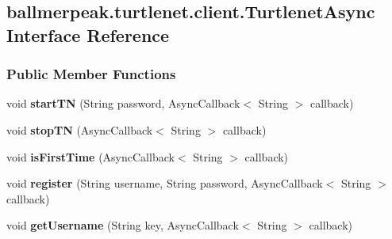 \hypertarget{interfaceballmerpeak_1_1turtlenet_1_1client_1_1TurtlenetAsync}{\subsection{ballmerpeak.\-turtlenet.\-client.\-Turtlenet\-Async Interface Reference}
\label{interfaceballmerpeak_1_1turtlenet_1_1client_1_1TurtlenetAsync}
}
\subsubsection*{Public Member Functions}
\begin{DoxyCompactItemize}
\item 
\hypertarget{interfaceballmerpeak_1_1turtlenet_1_1client_1_1TurtlenetAsync_a7e875c3b32ebacefaffa6ebd69aa2f44}{void {\bfseries start\-T\-N} (String password, Async\-Callback$<$ String $>$ callback)}\label{interfaceballmerpeak_1_1turtlenet_1_1client_1_1TurtlenetAsync_a7e875c3b32ebacefaffa6ebd69aa2f44}

\item 
\hypertarget{interfaceballmerpeak_1_1turtlenet_1_1client_1_1TurtlenetAsync_a70baaa36490a38c7e74cd9f57358336e}{void {\bfseries stop\-T\-N} (Async\-Callback$<$ String $>$ callback)}\label{interfaceballmerpeak_1_1turtlenet_1_1client_1_1TurtlenetAsync_a70baaa36490a38c7e74cd9f57358336e}

\item 
\hypertarget{interfaceballmerpeak_1_1turtlenet_1_1client_1_1TurtlenetAsync_ab4af3d58c26899d68d862bd720624a89}{void {\bfseries is\-First\-Time} (Async\-Callback$<$ String $>$ callback)}\label{interfaceballmerpeak_1_1turtlenet_1_1client_1_1TurtlenetAsync_ab4af3d58c26899d68d862bd720624a89}

\item 
\hypertarget{interfaceballmerpeak_1_1turtlenet_1_1client_1_1TurtlenetAsync_a9190e36e28740c7d668894192b7f2426}{void {\bfseries register} (String username, String password, Async\-Callback$<$ String $>$ callback)}\label{interfaceballmerpeak_1_1turtlenet_1_1client_1_1TurtlenetAsync_a9190e36e28740c7d668894192b7f2426}

\item 
\hypertarget{interfaceballmerpeak_1_1turtlenet_1_1client_1_1TurtlenetAsync_a95d3fddff52812d79a984b9ef91c80ef}{void {\bfseries get\-Username} (String key, Async\-Callback$<$ String $>$ callback)}\label{interfaceballmerpeak_1_1turtlenet_1_1client_1_1TurtlenetAsync_a95d3fddff52812d79a984b9ef91c80ef}


\end{DoxyCompactItemize}
